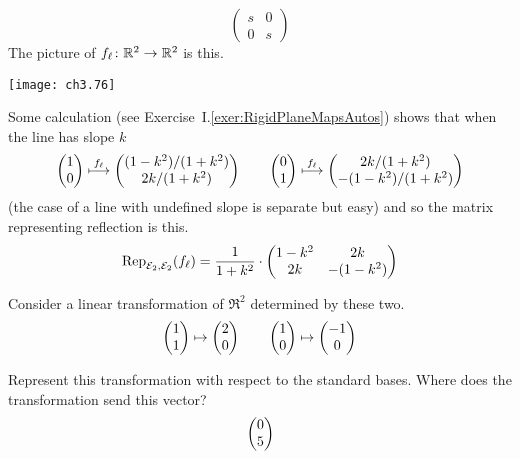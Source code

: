 \begin{exercises}
\begin{answer}
\begin{exparts}
\begin{equation*}
\begin{pmatrix}
              s  &0  \\
              0  &s
           \end{pmatrix}
        \end{equation*}
      \partsitem The picture of $\map{f_\ell}{\Re^2}{\Re^2}$ is this.
         \begin{center}  \small
           \texttt{[image: ch3.76]}
        \end{center}
       Some calculation (see Exercise~I.\ref{exer:RigidPlaneMapsAutos})
       shows that when the line has slope $k$ 
       \begin{equation*}
         \colvec{1 \\ 0}
             \mapsunder{f_\ell}\colvec{(1-k^2)/(1+k^2) \\ 2k/(1+k^2)}
         \qquad
         \colvec{0 \\ 1}
             \mapsunder{f_\ell}\colvec{2k/(1+k^2) \\ -(1-k^2)/(1+k^2)}
       \end{equation*}
       (the case of a line with undefined slope is separate but easy) 
       and so the matrix representing reflection is this.
       \begin{equation*}
         \rep{f_\ell}{\stdbasis_2,\stdbasis_2}
         =\frac{1}{1+k^2}\cdot\begin{pmatrix}
            1-k^2  &2k  \\
            2k     &-(1-k^2)
         \end{pmatrix}
       \end{equation*}
      \end{exparts}  
    \end{answer}
  \recommended \item  
    Consider a linear transformation of \( \Re^2 \) determined
    by these two.
    \begin{equation*}
      \colvec{1 \\ 1}\mapsto\colvec{2 \\ 0}
      \qquad
      \colvec{1 \\ 0}\mapsto\colvec{-1 \\ 0}
    \end{equation*}
    \begin{exparts}
      \partsitem Represent this transformation with respect to the standard
        bases.
      \partsitem Where does the transformation send this vector?
        \begin{equation*}
          \colvec{0 \\ 5}

\end{equation*}
\end{exparts}
\end{exercises}
